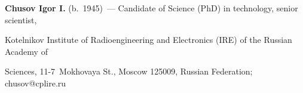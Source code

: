 \noindent

\textbf{Chusov Igor I.} (b.\ 1945)~--- Candidate of Science (PhD) in technology, senior scientist, 

Kotelnikov Institute of Radioengineering and Electronics (IRE) of the Russian Academy of 

Sciences,  11-7~Mokhovaya St., Moscow 125009, Russian Federation; \mbox{chusov@cplire.ru}



\label{end\stat}





\renewcommand{\bibname}{\protect\rm Литература}

